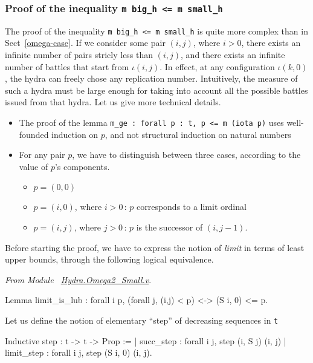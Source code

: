 \subsubsection{Proof of the inequality \texttt{m big\_h <= m small\_h} }


The proof of the inequality \texttt{m big\_h <= m small\_h} is quite more complex than in Sect~\ref{omega-case}.  If we consider some pair $(i,j)$, where $i>0$, there exists an infinite number of
pairs stricly less than $(i,j)$, and there exists an infinite number of battles that start from
$\iota(i,j)$. In effect, at any configuration $\iota(k,0)$, the hydra can freely chose any replication number. Intuitively, the measure of such a hydra must be large enough for taking into account
all the possible battles issued from that hydra.
Let us give more technical details.

\begin{itemize}
\item The proof of the lemma \texttt{m\_ge : forall p : t,   p <= m (iota p)} uses well-founded induction on $p$, and not structural induction on natural numbers

\item For any pair $p$, we have to distinguish between three cases, according to the value of $p$'s components.
  \begin{itemize}
  \item $p=(0,0)$
  \item $p=(i,0)$, where $i>0$\,: $p$ corresponds to a limit ordinal
  \item $p=(i,j)$, where $j>0$\,: $p$ is the successor of $(i,j-1)$.
  \end{itemize}
\end{itemize}

Before starting the proof, we have to express the notion of \emph{limit} in terms of
least upper bounds, through the following logical equivalence.

\vspace{4pt}
\emph{From Module ~\href{../src/html/hydras.Hydra.Omega2_Small.html\#limit_is_lub}{Hydra.Omega2\_Small.v}}.

\begin{Coqsrc}
Lemma limit_is_lub : forall i p, 
   (forall j, (i,j) < p) <-> (S i, 0) <= p.  
\end{Coqsrc}

Let us define the notion of elementary ``step'' of decreasing sequences in
\texttt{t}


\begin{Coqsrc}
Inductive step : t -> t -> Prop :=
| succ_step : forall i j,  step (i, S j) (i, j)
| limit_step : forall i j, step (S i, 0) (i, j).
\end{Coqsrc}

